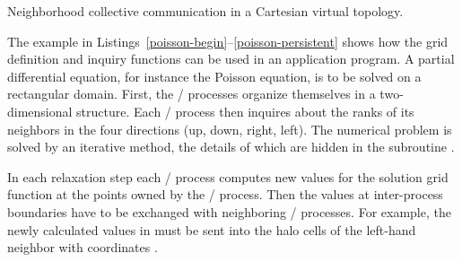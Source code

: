 \begin{example}
\label{topol-exF}
%
%
%
%
%
Neighborhood collective communication in a Cartesian virtual topology.

The example in 
Listings~\ref{poisson-begin}--\ref{poisson-persistent}
shows how the grid definition and
inquiry functions can be used in an application program. A partial
differential equation, for instance the Poisson equation, is to be
solved on a rectangular domain.
First, the \MPI/ processes organize themselves in a two-dimensional
structure. Each \MPI/ process then inquires about the ranks of its
neighbors in the four directions (up, down, right, left).
The numerical problem is solved by an iterative method, the details
of which are hidden in the subroutine .

In each relaxation step each \MPI/ process computes new values for the solution grid
function at the points 
owned by the \MPI/ process. Then the values at inter-process
boundaries have to be exchanged with neighboring \MPI/ processes.
For example, the
newly calculated values in 
must be sent into the halo cells 
of the left-hand neighbor with coordinates .


\end{example}
